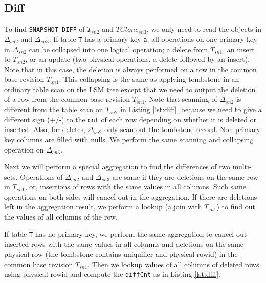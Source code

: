 \documentclass[sigconf,nonacm]{acmart} %
\begin{document}
\subsection{Diff}
To find \texttt{SNAPSHOT DIFF} of $T_{sn2}$ and $TClone_{sn3}$, 
we only need to read the objects in $\Delta_{sn2}$ and $\Delta_{sn3}$.  
If table \texttt{T} has a primary key \texttt{a},
all operations on one primary key in $\Delta_{sn2}$ can be collapsed 
into one logical operation; a delete from $T_{sn1}$, an insert to $T_{sn2}$, 
or an update (two physical operations, a delete followed by an insert).
Note that in this case, the deletion is always performed on a row in 
the common base revision $T_{sn1}$.  This collapsing is the same as 
applying tombstone in an ordinary table scan on the LSM tree except 
that we need to output the deletion of a row from the common base 
revision $T_{sn1}$.  Note that scanning of $\Delta_{sn2}$ is different
from the table scan on $T_{sn2}$ in Listing \ref{lst:diff}, because we 
need to give a different sign (+/-) to the \texttt{cnt} of each row 
depending on whether it is deleted or inserted.  Also, for deletes, 
$\Delta_{sn2}$ only scan out the tombstone record.  Non primary key
columns are filled with nulls. We perform the same 
scanning and collapsing operation on $\Delta_{sn3}$.  

Next we will perform a special aggregation to find the differences
of two multi-sets.  Operations of $\Delta_{sn2}$ and $\Delta_{sn3}$ 
are same if they are deletions on the same row in $T_{sn1}$, or, 
insertions of rows with the same values in all columns.  Such same 
operations on both sides will cancel out in the aggregation. 
If there are deletions left in the aggregation result, we perform 
a lookup (a join with $T_{sn1}$) to find out the values of all columns
of the row.

If table \texttt{T} has no primary key, we perform the same aggregation 
to cancel out inserted rows with the same values in all columns and 
deletions on the same physical row (the tombstone contains uniquifier 
and physical rowid) in the common base revision $T_{sn1}$.  
Then we lookup values of all columns of deleted rows using physical rowid
and compute the \texttt{diffCnt} as in Listing \ref{lst:diff}.
\end{document}
